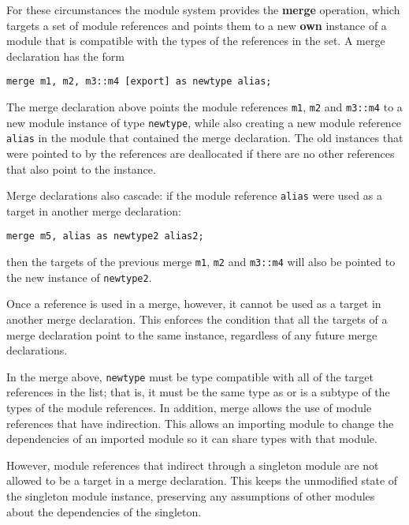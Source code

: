 For these circumstances the module system provides the \textbf{merge} operation,
which targets a set of module references and points them to a new \textbf{own} instance
of a module that is compatible with the types of the references in the set. A merge
declaration has the form

\begin{lstlisting}
merge m1, m2, m3::m4 [export] as newtype alias;
\end{lstlisting}

The merge declaration above points the module references \texttt{m1}, \texttt{m2} and
\texttt{m3::m4} to a new module instance of type \texttt{newtype}, while also creating a
new module reference \texttt{alias} in the module that contained the merge declaration. 
The old instances that were pointed to by the references are deallocated if there are no
other references that also point to the instance.

Merge declarations also cascade: if the module reference \texttt{alias} were used as a target in
another merge declaration:

\begin{lstlisting}
merge m5, alias as newtype2 alias2;
\end{lstlisting}

then the targets of the previous merge \texttt{m1}, \texttt{m2} and \texttt{m3::m4} will also
be pointed to the new instance of \texttt{newtype2}. 

Once a reference is used in a merge, however,
it cannot be used as a target in another merge declaration. This enforces the condition that
all the targets of a merge declaration point to the same instance, regardless of any future merge
declarations.

In the merge above, \texttt{newtype} must be type compatible with all of the target references
in the list; that is, it must be the same type as or is a subtype of the types of the module
references. In addition, merge allows the use of module references that have indirection. This allows 
an importing module to change the dependencies of an imported module so it can share types with
that module. 

However, module references that indirect through a singleton module are not allowed to
be a target in a merge declaration. This keeps the unmodified state of the singleton module
instance, preserving any assumptions of other modules about the dependencies of the singleton.

